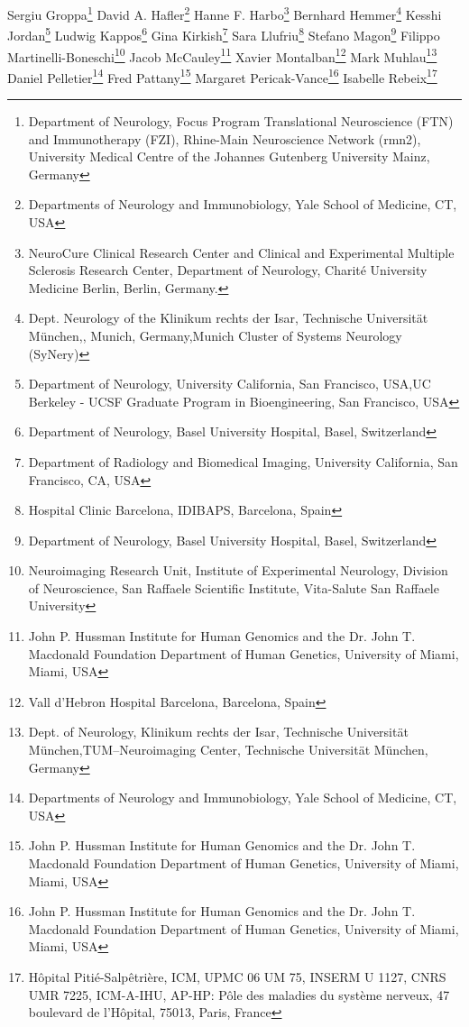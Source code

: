 Sergiu Groppa\footnote[17]{Department of Neurology, Focus Program Translational Neuroscience (FTN) and Immunotherapy (FZI), Rhine-Main Neuroscience Network (rmn2), University Medical Centre of the Johannes Gutenberg University Mainz, Germany}
David A. Hafler\footnote[18]{Departments of Neurology and Immunobiology, Yale School of Medicine, CT, USA}
Hanne F. Harbo\footnote[3]{NeuroCure Clinical Research Center and Clinical and Experimental Multiple Sclerosis Research Center, Department of Neurology, Charité University Medicine Berlin, Berlin, Germany.}
Bernhard Hemmer\footnote[19,20]{Dept. Neurology of the  Klinikum rechts der Isar, Technische Universität München,, Munich, Germany,Munich Cluster of Systems Neurology (SyNery)}
Kesshi Jordan\footnote[1,2]{Department of Neurology, University California, San Francisco,  USA,UC Berkeley - UCSF Graduate Program in Bioengineering, San Francisco, USA}
Ludwig Kappos\footnote[6]{Department of Neurology, Basel University Hospital, Basel, Switzerland}
Gina Kirkish\footnote[11]{Department of Radiology and Biomedical Imaging, University California, San Francisco, CA, USA}
Sara Llufriu\footnote[21]{Hospital Clinic Barcelona, IDIBAPS, Barcelona, Spain}
Stefano Magon\footnote[6]{Department of Neurology, Basel University Hospital, Basel, Switzerland}
Filippo Martinelli-Boneschi\footnote[14]{Neuroimaging Research Unit, Institute of Experimental Neurology, Division of Neuroscience, San Raffaele Scientific Institute, Vita-Salute San Raffaele University}
Jacob McCauley\footnote[22]{John P. Hussman Institute for Human Genomics and the Dr. John T. Macdonald Foundation Department of Human Genetics, University of Miami, Miami, USA}
Xavier Montalban\footnote[10]{Vall d’Hebron Hospital Barcelona, Barcelona, Spain}
Mark Muhlau\footnote[23,24]{Dept. of Neurology, Klinikum rechts der Isar, Technische Universität München,TUM–Neuroimaging Center, Technische Universität München, Germany}
Daniel Pelletier\footnote[18]{Departments of Neurology and Immunobiology, Yale School of Medicine, CT, USA}
Fred Pattany\footnote[22]{John P. Hussman Institute for Human Genomics and the Dr. John T. Macdonald Foundation Department of Human Genetics, University of Miami, Miami, USA}
Margaret Pericak-Vance\footnote[22]{John P. Hussman Institute for Human Genomics and the Dr. John T. Macdonald Foundation Department of Human Genetics, University of Miami, Miami, USA}
Isabelle Rebeix\footnote[15]{Hôpital Pitié-Salpêtrière, ICM, UPMC 06 UM 75, INSERM U 1127, CNRS UMR 7225, ICM-A-IHU, AP-HP: Pôle des maladies du système nerveux, 47 boulevard de l'Hôpital, 75013, Paris, France}
